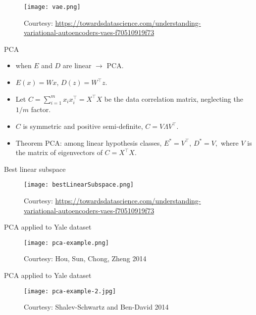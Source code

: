 \documentclass[final]{beamer}
\begin{document}
\begin{frame}
\begin{figure}
	\texttt{[image: vae.png]}
	\caption{Courtesy: \url{https://towardsdatascience.com/understanding-variational-autoencoders-vaes-f70510919f73}}
\end{figure}
\end{frame}
\begin{frame}{PCA}
	\begin{itemize}
	\item when $E$ and $D$ are linear $\to$ PCA.
	\pause 
	\item $E(x) = Wx$, $D(z) = W^\top z$.
	\pause
\item Let $C = \sum_{i=1}^m x_i x_i^\top = X^\top X$ be the data correlation matrix, neglecting the $1/m$ factor.
	\pause 
	\item $C$ is symmetric and positive semi-definite, $C = V \Lambda V^\top$.
	\item Theorem PCA: among linear hypothesis classes, $E^* = V^\top$, $D^* = V,$ where $V$ is the matrix of eigenvectors of $C = X^\top X$.
	\end{itemize}
\end{frame}
\begin{frame}{Best linear subspace}
	\begin{figure}
	\texttt{[image: bestLinearSubspace.png]}
	\caption{Courtesy: \url{https://towardsdatascience.com/understanding-variational-autoencoders-vaes-f70510919f73}}

	\end{figure}
\end{frame}
\begin{frame}{PCA applied to Yale dataset}
	\begin{figure}
		\texttt{[image: pca-example.png]}
	\caption{Courtesy: Hou, Sun, Chong, Zheng 2014}
	\end{figure}
\end{frame}
\begin{frame}{PCA applied to Yale dataset}
	\begin{figure}
		\texttt{[image: pca-example-2.jpg]}
	\caption{Courtesy: Shalev-Schwartz and Ben-David 2014}
	\end{figure}
\end{frame}
\end{document}
